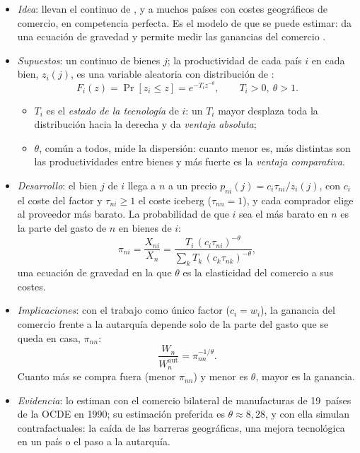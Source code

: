 \documentclass[11pt]{article}
\begin{document}
\begin{itemize}
\item \emph{Idea}: \textcite{EatonKortum2002Technology} llevan el continuo de ,  y  a muchos países con costes geográficos de comercio, en competencia perfecta. Es el modelo de  que se puede estimar: da una ecuación de gravedad y permite medir las ganancias del comercio .
\item \emph{Supuestos}: un continuo de bienes $j$; la productividad de cada país $i$ en cada bien, $z_i(j)$, es una variable aleatoria con distribución de :
  \begin{equation}\label{eq:frechet}
  F_i(z)=\Pr[z_i\le z]=e^{-T_iz^{-\theta}},\qquad T_i>0,\ \theta>1.
  \end{equation}
  \begin{itemize}
  \item $T_i$ es el \emph{estado de la tecnología} de $i$: un $T_i$ mayor desplaza toda la distribución hacia la derecha y da \emph{ventaja absoluta};
  \item $\theta$, común a todos, mide la dispersión: cuanto menor es, más distintas son las productividades entre bienes y más fuerte es la \emph{ventaja comparativa}.
  \end{itemize}
\item \emph{Desarrollo}: el bien $j$ de $i$ llega a $n$ a un precio $p_{ni}(j)=c_i\tau_{ni}/z_i(j)$, con $c_i$ el coste del factor y $\tau_{ni}\ge1$ el coste iceberg ($\tau_{nn}=1$), y cada comprador elige al proveedor más barato. La probabilidad de que $i$ sea el más barato en $n$ es la parte del gasto de $n$ en bienes de $i$:
  \begin{equation}\label{eq:ek-gravedad}
  \pi_{ni}=\frac{X_{ni}}{X_n}=\frac{T_i\,(c_i\tau_{ni})^{-\theta}}{\sum_k T_k\,(c_k\tau_{nk})^{-\theta}},
  \end{equation}
  una ecuación de gravedad en la que $\theta$ es la elasticidad del comercio a sus costes.
\item \emph{Implicaciones}: con el trabajo como único factor ($c_i=w_i$), la ganancia del comercio frente a la autarquía depende solo de la parte del gasto que se queda en casa, $\pi_{nn}$:
  \begin{equation}\label{eq:ek-ganancias}
  \frac{W_n}{W_n^{\mathrm{aut}}}=\pi_{nn}^{-1/\theta}.
  \end{equation}
  Cuanto más se compra fuera (menor $\pi_{nn}$) y menor es $\theta$, mayor es la ganancia.
\item \emph{Evidencia}: lo estiman con el comercio bilateral de manufacturas de 19~países de la OCDE en 1990; su estimación preferida es $\theta\approx8{,}28$, y con ella simulan contrafactuales: la caída de las barreras geográficas, una mejora tecnológica en un país o el paso a la autarquía\nocite{EatonKortum2002Technology}.

\end{itemize}
\end{document}
